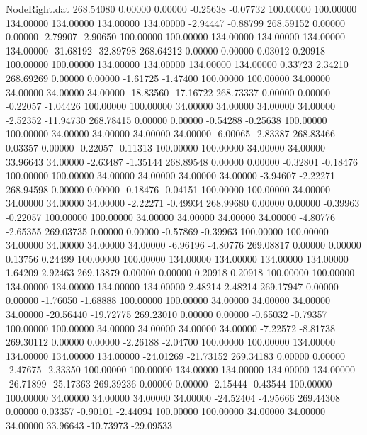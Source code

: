 \begin{filecontents}{NodeRight.dat}
 268.54080    0.00000    0.00000    -0.25638   -0.07732  100.00000  100.00000  134.00000  134.00000  134.00000  134.00000   -2.94447   -0.88799
 268.59152    0.00000    0.00000    -2.79907   -2.90650  100.00000  100.00000  134.00000  134.00000  134.00000  134.00000  -31.68192  -32.89798
 268.64212    0.00000    0.00000     0.03012    0.20918  100.00000  100.00000  134.00000  134.00000  134.00000  134.00000    0.33723    2.34210
 268.69269    0.00000    0.00000    -1.61725   -1.47400  100.00000  100.00000   34.00000   34.00000   34.00000   34.00000  -18.83560  -17.16722
 268.73337    0.00000    0.00000    -0.22057   -1.04426  100.00000  100.00000   34.00000   34.00000   34.00000   34.00000   -2.52352  -11.94730
 268.78415    0.00000    0.00000    -0.54288   -0.25638  100.00000  100.00000   34.00000   34.00000   34.00000   34.00000   -6.00065   -2.83387
 268.83466    0.03357    0.00000    -0.22057   -0.11313  100.00000  100.00000   34.00000   34.00000   33.96643   34.00000   -2.63487   -1.35144
 268.89548    0.00000    0.00000    -0.32801   -0.18476  100.00000  100.00000   34.00000   34.00000   34.00000   34.00000   -3.94607   -2.22271
 268.94598    0.00000    0.00000    -0.18476   -0.04151  100.00000  100.00000   34.00000   34.00000   34.00000   34.00000   -2.22271   -0.49934
 268.99680    0.00000    0.00000    -0.39963   -0.22057  100.00000  100.00000   34.00000   34.00000   34.00000   34.00000   -4.80776   -2.65355
 269.03735    0.00000    0.00000    -0.57869   -0.39963  100.00000  100.00000   34.00000   34.00000   34.00000   34.00000   -6.96196   -4.80776
 269.08817    0.00000    0.00000     0.13756    0.24499  100.00000  100.00000  134.00000  134.00000  134.00000  134.00000    1.64209    2.92463
 269.13879    0.00000    0.00000     0.20918    0.20918  100.00000  100.00000  134.00000  134.00000  134.00000  134.00000    2.48214    2.48214
 269.17947    0.00000    0.00000    -1.76050   -1.68888  100.00000  100.00000   34.00000   34.00000   34.00000   34.00000  -20.56440  -19.72775
 269.23010    0.00000    0.00000    -0.65032   -0.79357  100.00000  100.00000   34.00000   34.00000   34.00000   34.00000   -7.22572   -8.81738
 269.30112    0.00000    0.00000    -2.26188   -2.04700  100.00000  100.00000  134.00000  134.00000  134.00000  134.00000  -24.01269  -21.73152
 269.34183    0.00000    0.00000    -2.47675   -2.33350  100.00000  100.00000  134.00000  134.00000  134.00000  134.00000  -26.71899  -25.17363
 269.39236    0.00000    0.00000    -2.15444   -0.43544  100.00000  100.00000   34.00000   34.00000   34.00000   34.00000  -24.52404   -4.95666
 269.44308    0.00000    0.03357    -0.90101   -2.44094  100.00000  100.00000   34.00000   34.00000   34.00000   33.96643  -10.73973  -29.09533

\end{filecontents}
